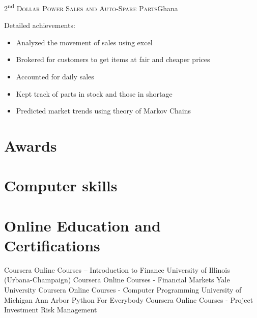 \documentclass[11pt,a4paper,sans]{moderncv} %
\begin{document}
{2\textsuperscript{nd}}
{\textsc{Dollar Power Sales and Auto-Spare Parts}}{Ghana}
{}{
Detailed achievements:
\begin{itemize}
\item 	Analyzed the movement of sales using excel
\item 	Brokered for customers to get items at fair and cheaper prices
\item 	Accounted for daily sales
\item 	Kept track of parts in stock and those in shortage
\item 	Predicted market trends using theory of Markov Chains
\end{itemize}}

\section{Awards}


\section{Computer skills}



\section{Online Education and Certifications}
{Coursera Online Courses – Introduction to Finance
 University of Illinois (Urbana-Champaign)}
{Coursera Online Courses - Financial Markets
Yale University}
{Coursera Online Courses - Computer Programming
University of Michigan Ann Arbor
Python For Everybody}
{Coursera Online Courses - Project
Investment Risk Management}
\end{document}
